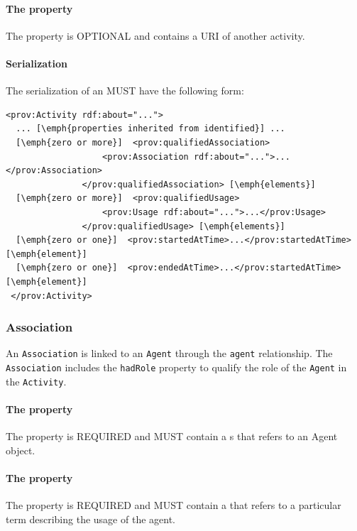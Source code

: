 {\paragraph{The  property}\label{sec:wasInformedBy}
The  property is OPTIONAL and contains a URI of another activity.

\paragraph{Serialization}
The serialization of an  MUST have the following form:
}

\begin{lstlisting}
<prov:Activity rdf:about="...">
  ... [\emph{properties inherited from identified}] ...
  [\emph{zero or more}]  <prov:qualifiedAssociation>
                   <prov:Association rdf:about="...">...</prov:Association>
               </prov:qualifiedAssociation> [\emph{elements}]
  [\emph{zero or more}]  <prov:qualifiedUsage>
                   <prov:Usage rdf:about="...">...</prov:Usage>
               </prov:qualifiedUsage> [\emph{elements}]             
  [\emph{zero or one}]  <prov:startedAtTime>...</prov:startedAtTime> [\emph{element}]
  [\emph{zero or one}]  <prov:endedAtTime>...</prov:startedAtTime> [\emph{element}] 
 </prov:Activity>
\end{lstlisting}

\subsubsection{Association}
\label{sec:Association}
An \texttt{Association} is linked to an \texttt{Agent} through the \texttt{agent} relationship. The \texttt{Association} includes the \texttt{hadRole} property to qualify the role of the \texttt{Agent} in the \texttt{Activity}.

\paragraph{The  property}\label{sec:agent}
The  property is REQUIRED and MUST contain a s that refers to an Agent object.

\paragraph{The  property}\label{sec:hadRole}
The  property is REQUIRED and MUST contain a  that refers to a particular term describing the usage of the agent.

